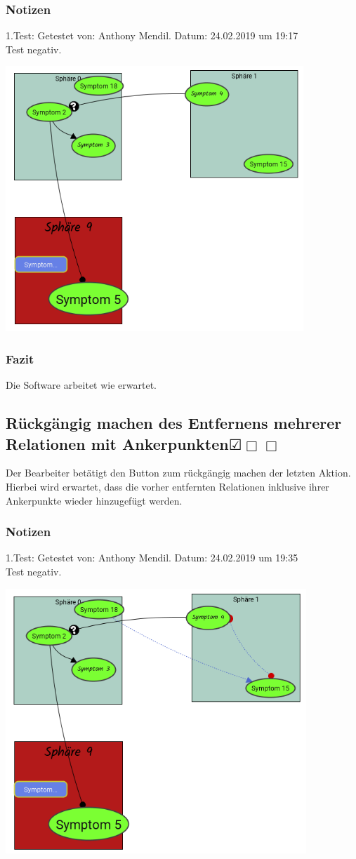 \documentclass{scrartcl}
\newcommand{\subsectiont}[2]{\subsection[#1]{#1{\normalsize\normalfont #2}}}
\newcommand{\leer}{$\Box$}
\newcommand{\ok}{$\CheckedBox$}
\begin{document}
\subsubsection{Notizen}
1.Test: Getestet von: Anthony Mendil. Datum: 24.02.2019 um 19:17 \\
Test negativ. 
\begin{center}
\includegraphics[height=10cm]{3_40.PNG}
\end{center}
\subsubsection{Fazit}
Die Software arbeitet wie erwartet.

\subsectiont{Rückgängig machen des Entfernens mehrerer Relationen mit Ankerpunkten}{\dotfill\ok\leer\leer}
Der Bearbeiter betätigt den Button zum rückgängig machen der letzten Aktion. Hierbei wird erwartet, dass die vorher entfernten Relationen inklusive ihrer Ankerpunkte wieder hinzugefügt werden.
\subsubsection{Notizen}
1.Test: Getestet von: Anthony Mendil. Datum: 24.02.2019 um 19:35 \\
Test negativ. 
\begin{center}
\includegraphics[height=10cm]{3_41.PNG}
\end{center}
\end{document}
